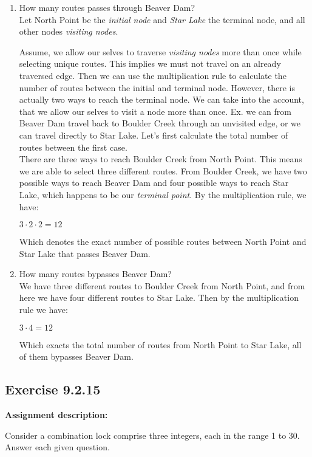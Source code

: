 \documentclass{report}
\newcommand{\cent}[1]{\begin{center}#1\end{center}}
\newcommand{\AssignmentDescription}{\textbf{Assignment description: }}
\newcommand{\Exercise}[1]{\subsection{Exercise #1}}
\newcommand{\defaultEnumerateLabel}{\textbf{\alph*.}}
\newcommand{\MyItem}[1]{\item #1\\}
\begin{document}
 	\begin{enumerate}[label=\defaultEnumerateLabel]
 		\MyItem{How many routes passes through Beaver Dam?}
 		
 		Let North Point be the \textit{initial node} and \textit{Star Lake} the terminal node, and all other nodes \textit{visiting nodes}.
 		
 		Assume, we allow our selves to traverse \textit{visiting nodes} more than once while selecting unique routes. This implies we must not travel on an already traversed edge. Then we can use the multiplication rule to calculate the number of routes between the initial and terminal node. However, there is actually two ways to reach the terminal node. We can take into the account, that we allow our selves to visit a node more than once. Ex. we can from Beaver Dam travel back to Boulder Creek through an unvisited edge, or we can travel directly to Star Lake. Let's first calculate the total number of routes between the first case. \\
 		
 		There are three ways to reach Boulder Creek from North Point. This means we are able to select three different routes. From Boulder Creek, we have two possible ways to reach Beaver Dam and four possible ways to reach Star Lake, which happens to be our \textit{terminal point}. By the multiplication rule, we have:
 		\cent{$3 \cdot 2 \cdot 2 = 12$}
 		
 		Which denotes the exact number of possible routes between North Point and Star Lake that passes Beaver Dam.\\
 		 		
 		\MyItem{How many routes bypasses Beaver Dam?}
 		
 		We have three different routes to Boulder Creek from North Point, and from here we have four different routes to Star Lake. Then by the multiplication rule we have:
 		
 		\cent{$3 \cdot 4 = 12$}
 		
 		Which exacts the total number of routes from North Point to Star Lake, all of them bypasses Beaver Dam.\\
 		
 	\end{enumerate}
 	
 	\Exercise{9.2.15}
 	
 	\AssignmentDescription
 	
 	Consider a combination lock comprise three integers, each in the range 1 to 30. Answer each given question.\\
 	
\end{document}
